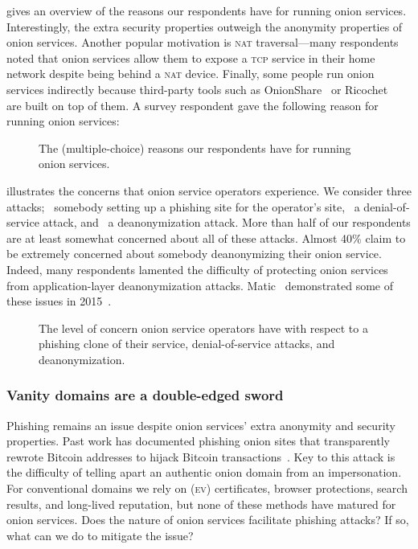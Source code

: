  gives an overview of the reasons our
respondents have for running onion services.  Interestingly, the extra security
properties outweigh the anonymity properties of onion services.  Another popular
motivation is \textsc{nat} traversal---many respondents noted that onion
services allow them to expose a \textsc{tcp} service in their home network
despite being behind a \textsc{nat} device.  Finally, some people run onion
services indirectly because third-party tools such as
OnionShare~\cite{onionshare} or Ricochet~\cite{ricochet} are built on top of
them.  A survey respondent gave the following reason for running onion services:

\begin{figure}[t]
    \centering
    
    \caption{The (multiple-choice) reasons our respondents have for running
    onion services.}
    \label{fig:onion-operation-reasons}
\end{figure}

 illustrates the concerns that onion service
operators experience.  We consider three attacks; \first~somebody setting up a
phishing site for the operator's site, \second~a denial-of-service attack, and
\third~a deanonymization attack.  More than half of our respondents are at least
somewhat concerned about all of these attacks.  Almost 40\% claim to be
extremely concerned about somebody deanonymizing their onion service.  Indeed,
many respondents lamented the difficulty of protecting onion services from
application-layer deanonymization attacks.  Matic \ea\ demonstrated some of
these issues in 2015~\cite{Matic2015a}.

\begin{figure}[t]
    \centering
    
    \caption{The level of concern onion service operators have with respect to a
    phishing clone of their service, denial-of-service attacks, and
    deanonymization.}
    \label{fig:onion-operation-concerns}
\end{figure}

\subsubsection{Vanity domains are a double-edged sword}

Phishing remains an issue despite onion services' extra anonymity and security
properties.  Past work has documented phishing onion sites that transparently
rewrote Bitcoin addresses to hijack Bitcoin
transactions~\cite{Winter2016a,Nurmi2015a,Monteiro2016a}.  Key to this attack is
the difficulty of telling apart an authentic onion domain from an impersonation.
For conventional domains we rely on (\textsc{ev}) certificates, browser
protections, search results, and long-lived reputation, but none of these
methods have matured for onion services.  Does the nature of onion services
facilitate phishing attacks?  If so, what can we do to mitigate the issue?

